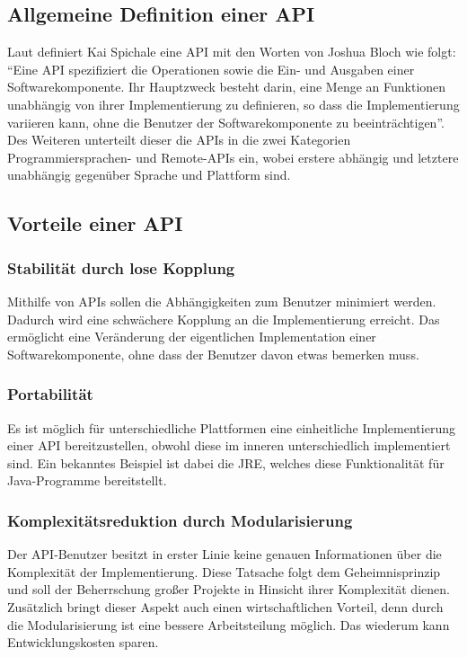 \subsection{Allgemeine Definition einer API}\label{sec:defAPI}
Laut \cite[7]{apiDesign} definiert Kai Spichale eine \gls{API} mit den Worten von Joshua Bloch wie folgt: \enquote{Eine API spezifiziert die Operationen sowie die Ein- und Ausgaben einer Softwarekomponente. Ihr Hauptzweck besteht darin, eine Menge an Funktionen unabhängig von ihrer Implementierung zu definieren, so dass die Implementierung variieren kann, ohne die Benutzer der Softwarekomponente zu beeinträchtigen}. Des Weiteren unterteilt dieser die \glspl{API} in die zwei Kategorien Programmiersprachen- und Remote-\glspl{API} ein, wobei erstere abhängig und letztere unabhängig gegenüber Sprache und Plattform sind.

\subsection{Vorteile einer API}
\subsubsection{Stabilität durch lose Kopplung}
Mithilfe von \glspl{API} sollen die Abhängigkeiten zum Benutzer minimiert werden. Dadurch wird eine schwächere Kopplung an die Implementierung erreicht. Das ermöglicht eine Veränderung der eigentlichen Implementation einer Softwarekomponente, ohne dass der Benutzer davon etwas bemerken muss.

\subsubsection{Portabilität}
Es ist möglich für unterschiedliche Plattformen eine einheitliche Implementierung einer \gls{API} bereitzustellen, obwohl diese im inneren unterschiedlich implementiert sind. Ein bekanntes Beispiel ist dabei die \gls{JRE}, welches diese Funktionalität für Java-Programme bereitstellt.

\subsubsection{Komplexitätsreduktion durch Modularisierung}
Der \gls{API}-Benutzer besitzt in erster Linie keine genauen Informationen über die Komplexität der Implementierung. Diese Tatsache folgt dem Geheimnisprinzip und soll der Beherrschung großer Projekte in Hinsicht ihrer Komplexität dienen. Zusätzlich bringt dieser Aspekt auch einen wirtschaftlichen Vorteil, denn durch die Modularisierung ist eine bessere Arbeitsteilung möglich. Das wiederum kann Entwicklungskosten sparen.


